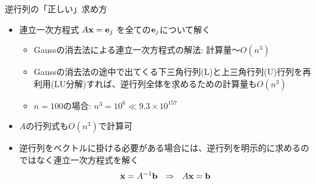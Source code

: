 \begin{frame}[t,fragile]{逆行列の「正しい」求め方}
  \begin{itemize}
  \item 連立一次方程式 $A {\bf x} = {\bf e}_j$ を全ての${\bf e}_j$について解く
    \begin{itemize}
    \item Gaussの消去法による連立一次方程式の解法: 計算量〜$O(n^3)$
    \item Gaussの消去法の途中で出てくる下三角行列(L)と上三角行列(U)行列を再利用(LU分解)すれば、逆行列全体を求めるための計算量も$O(n^3)$
    \item $n=100$の場合: $n^3 = 10^6 \ll 9.3 \times 10^{157}$
    \end{itemize}
  \item $A$の行列式も$O(n^3)$で計算可 \\[2em]
  \item 逆行列をベクトルに掛ける必要がある場合には、逆行列を明示的に求めるのではなく連立一次方程式を解く
    \[ {\bf x} = A^{-1} {\bf b} \ \ \Rightarrow \ \ A {\bf x} = {\bf b} \]
  \end{itemize}
\end{frame}
